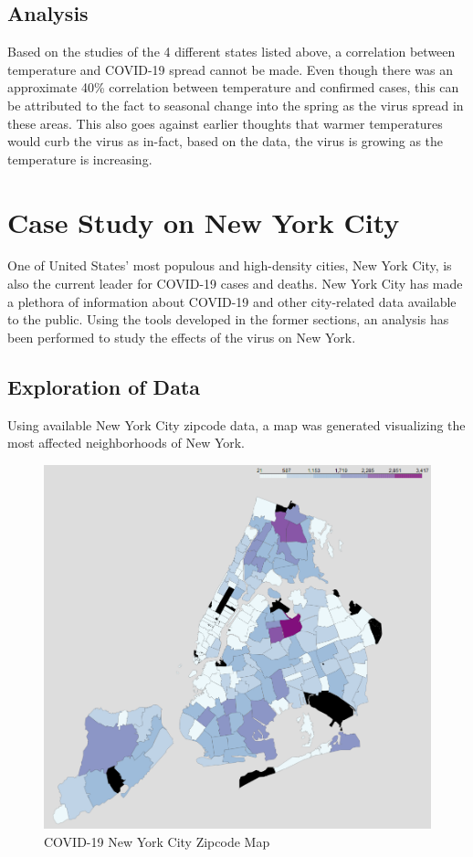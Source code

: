 \documentclass{homework}
\begin{document}
\subsection{Analysis}

Based on the studies of the 4 different states listed above, a correlation between temperature and COVID-19 spread cannot be made. Even though there was an approximate 40\% correlation between temperature and confirmed cases, this can be attributed to the fact to seasonal change into the spring as the virus spread in these areas. This also goes against earlier thoughts that warmer temperatures would curb the virus as in-fact, based on the data, the virus is growing as the temperature is increasing.

\newpage
\section{Case Study on New York City}

One of United States' most populous and high-density cities, New York City, is also the current leader for COVID-19 cases and deaths. New York City has made a plethora of information about COVID-19 and other city-related data available to the public. Using the tools developed in the former sections, an analysis has been performed to study the effects of the virus on New York. 

\subsection{Exploration of Data}

Using available New York City zipcode data, a map was generated visualizing the most affected neighborhoods of New York.

\begin{figure}[H]
  \centering
  \includegraphics[scale=0.3]{task5/map.PNG}
  \caption{COVID-19 New York City Zipcode Map}
\end{figure}
\end{document}
